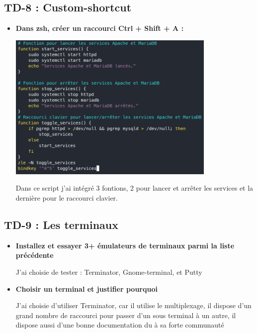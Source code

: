 \documentclass[12pt]{article}
\begin{document}
  \subsection{TD-8 : Custom-shortcut}
\vspace{0.3cm}

\begin{itemize}
  \item \textbf{Dans zsh, créer un raccourci Ctrl + Shift + A :}
  \vspace{0.3cm}

  \includegraphics[width=10cm]{images/screen-td8.png}
  \vspace{0.3cm}

  Dans ce script j'ai intégré 3 fontions, 2 pour lancer et arrêter les services et la dernière pour le raccourci clavier.
\end{itemize}

  \subsection{TD-9 : Les terminaux}
\vspace{0.3cm}

\begin{itemize}
  \item \textbf{Installez et essayer 3+ émulateurs de terminaux parmi la liste précédente}
  \vspace{0.3cm}

  J'ai choisie de tester : Terminator, Gnome-terminal, et Putty
\end{itemize}
\vspace{0.3cm}

\begin{itemize}
  \item \textbf{Choisir un terminal et justifier pourquoi}
  \vspace{0.3cm}

  J'ai choisie d'utiliser Terminator, car il utilise le multiplexage, il dispose d'un grand nombre de raccourci pour passer
  d'un sous terminal à un autre, il dispose aussi d'une bonne documentation du à sa forte communauté
\end{itemize}
\end{document}
